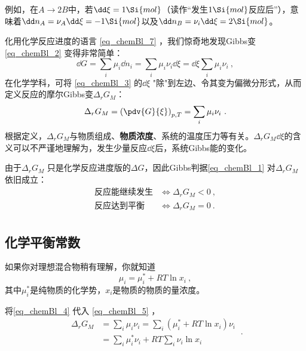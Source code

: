 例如，在$A\to2B$中，若$\dd \xi=1 \Si{mol}$（读作“发生$1 \Si{mol}$反应后”），意味着$\dd n_A = \nu_A \dd \xi = - 1 \Si{mol}$以及$\dd n_B = \nu_i \dd \xi = 2 \Si{mol}$。

化用化学反应进度的语言 \autoref{eq_chemBl_7} ，我们惊奇地发现Gibbs变 \autoref{eq_chemBl_2} 变得非常简单：
\begin{equation}\label{eq_chemBl_3}
\dd G = \sum_i \mu_i \dd n_i = \sum_i \mu_i \nu_i \dd \xi =  \dd \xi \sum_i \mu_i \nu_i~,
\end{equation}
在化学学科，可将 \autoref{eq_chemBl_3} 的$\dd \xi$ "除"到左边、令其变为偏微分形式，从而定义反应的摩尔Gibbs变$\Delta_r G_M$：
\begin{equation} \label{eq_chemBl_5}
\Delta_r G_M = \left(\pdv{G}{\xi}\right)_{p,T} = \sum_i \mu_i \nu_i~.
\end{equation}
根据定义，$\Delta_r G_M$与物质组成、\textbf{物质浓度}、系统的温度压力等有关。$\Delta_r G_M \dd \xi$的含义可以不严谨地理解为，发生少量反应$\dd \xi$后，系统Gibbs能的变化。

由于$\Delta_r G_M$ 只是化学反应进度版的$\Delta G$，因此Gibbs判据\autoref{eq_chemBl_1} 对$\Delta_r G_M$依旧成立：
\begin{equation}\label{eq_chemBl_6}
\begin{aligned}
\text{反应能继续发生} &\Longleftrightarrow \Delta_r G_M < 0~,\\
\text{反应达到平衡} &\Longleftrightarrow \Delta_r G_M = 0~.\\
\end{aligned}
\end{equation}



\subsection{化学平衡常数}
如果你对理想混合物稍有理解，你就知道
\begin{equation}\label{eq_chemBl_4}
\mu_i = \mu_i^* + RT \ln x_i~,
\end{equation}
其中$\mu_i^*$是纯物质的化学势，$x_i$是物质的物质的量浓度。

将\autoref{eq_chemBl_4} 代入 \autoref{eq_chemBl_5} ，
\begin{equation}
\begin{aligned}
\Delta_r G_M &= \sum_i \mu_i \nu_i = \sum_i (\mu_i^* + RT \ln x_i) \nu_i\\
&= \sum_i \mu_i^* \nu_i + RT \sum_i \nu_i \ln x_i
\end{aligned}~.
\end{equation}

